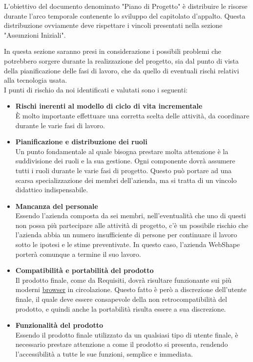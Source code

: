 L'obiettivo del documento denominato "Piano di Progetto" \`e distribuire le risorse durante l'arco temporale 
contenente lo sviluppo del capitolato d'appalto. Questa distribuzione ovviamente deve rispettare i vincoli presentati 
nella sezione "Assunzioni Iniziali".

In questa sezione saranno presi in considerazione i possibili problemi che potrebbero sorgere durante la realizzazione del progetto, sia dal punto di vista della pianificazione delle fasi di lavoro, che da quello di eventuali rischi relativi alla tecnologia usata.\\
I punti di rischio da noi identificati e valutati sono i seguenti:
\begin{itemize}
\item \textbf{Rischi inerenti al modello di ciclo di vita incrementale}\\
\`E molto importante effettuare una corretta scelta delle attivit\`a, da coordinare durante le varie fasi di lavoro.
\item \textbf{Pianificazione e distribuzione dei ruoli}\\
Un punto fondamentale al quale bisogna prestare molta attenzione \`e la suddivisione dei ruoli e la sua gestione. Ogni componente dovr\`a assumere tutti i ruoli durante le varie fasi di progetto. Questo pu\`o portare ad una scarsa specializzazione dei membri dell'azienda, ma si tratta di un vincolo didattico indispensabile.
\item \textbf{Mancanza del personale}\\
Essendo l'azienda composta da sei membri, nell'eventualit\`a che uno di questi non possa pi\`u partecipare alle attivit\`a di progetto, c'\`e un possibile rischio che l'azienda abbia un numero insufficiente di persone per continuare il lavoro sotto le ipotesi e le stime preventivate. In questo caso, l'azienda WebShape porter\`a comunque a termine il suo lavoro.
\item \textbf{Compatibilit\`a e portabilit\`a del prodotto}\\
Il prodotto finale, come da Requisiti, dovr\`a risultare funzionante sui pi\`u moderni {\underline{browser}} in circolazione. Questo fatto \`e per\`o  a discrezione dell'utente finale, il quale deve essere consapevole della non retrocompatibilit\`a del prodotto, e quindi anche la portabilit\`a risulta essere  a sua discrezione.
\item \textbf{Funzionalit\`a del prodotto}\\
Essendo il prodotto finale utilizzato da un qualsiasi tipo di utente finale, \`e necessario prestare attenzione a come il prodotto si presenta, rendendo l'accessibilit\`a a tutte le sue funzioni, semplice e immediata.
\end{itemize}			


